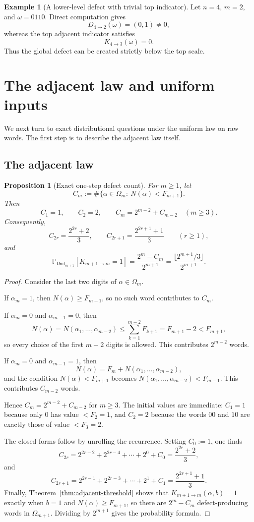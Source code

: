 \documentclass[11pt,reqno]{amsart}
\numberwithin{equation}{section}
\theoremstyle{plain}
\newtheorem{proposition}[theorem]{Proposition}
\theoremstyle{definition}
\newtheorem{example}[theorem]{Example}
\theoremstyle{remark}
\newcommand{\PP}{\mathbb{P}}
\newcommand{\Unif}{\mathsf{Unif}}
\begin{document}
\begin{example}[A lower-level defect with trivial top indicator]
\label{ex:defect-without-top-indicator}
Let $n=4$, $m=2$, and $\omega=0110$.  Direct computation gives
\[
D_{4\to 2}(\omega)=(0,1)\ne 0,
\]
whereas the top adjacent indicator satisfies
\[
K_{4\to 3}(\omega)=0.
\]
Thus the global defect can be created strictly below the top scale.
\end{example}

\section{The adjacent law and uniform inputs}
\label{sec:uniform}

We next turn to exact distributional questions under the uniform law on raw
words.  The first step is to describe the adjacent law itself.

\subsection{The adjacent law}

\begin{proposition}[Exact one-step defect count]
\label{thm:explicit-count}
For $m\ge 1$, let
\[
C_m:=\#\{\alpha\in\Omega_m:\ N(\alpha)<F_{m+1}\}.
\]
Then
\[
C_1=1,
\qquad
C_2=2,
\qquad
C_m=2^{m-2}+C_{m-2}\quad (m\ge 3).
\]
Consequently,
\[
C_{2r}=\frac{2^{2r}+2}{3},
\qquad
C_{2r+1}=\frac{2^{2r+1}+1}{3}
\qquad (r\ge 1),
\]
and
\[
\PP_{\Unif_{m+1}}[K_{m+1\to m}=1]
=
\frac{2^m-C_m}{2^{m+1}}
=
\frac{\lfloor 2^{m+1}/3\rfloor}{2^{m+1}}.
\]
\end{proposition}

\begin{proof}
Consider the last two digits of $\alpha\in\Omega_m$.

If $\alpha_m=1$, then $N(\alpha)\ge F_{m+1}$, so no such word contributes to
$C_m$.

If $\alpha_m=0$ and $\alpha_{m-1}=0$, then
\[
N(\alpha)=N(\alpha_1,\dots,\alpha_{m-2})
\le
\sum_{k=1}^{m-2}F_{k+1}
=
F_{m+1}-2
<
F_{m+1},
\]
so every choice of the first $m-2$ digits is allowed.  This contributes
$2^{m-2}$ words.

If $\alpha_m=0$ and $\alpha_{m-1}=1$, then
\[
N(\alpha)=F_m+N(\alpha_1,\dots,\alpha_{m-2}),
\]
and the condition $N(\alpha)<F_{m+1}$ becomes
$N(\alpha_1,\dots,\alpha_{m-2})<F_{m-1}$.  This contributes $C_{m-2}$ words.

Hence $C_m=2^{m-2}+C_{m-2}$ for $m\ge 3$.  The initial values are immediate:
$C_1=1$ because only $0$ has value $<F_2=1$, and $C_2=2$ because the words
$00$ and $10$ are exactly those of value $<F_3=2$.

The closed forms follow by unrolling the recurrence.  Setting $C_0:=1$, one
finds
\[
C_{2r}=2^{2r-2}+2^{2r-4}+\cdots+2^0+C_0=\frac{2^{2r}+2}{3},
\]
and
\[
C_{2r+1}=2^{2r-1}+2^{2r-3}+\cdots+2^1+C_1=\frac{2^{2r+1}+1}{3}.
\]
Finally, Theorem~\ref{thm:adjacent-threshold} shows that
$K_{m+1\to m}(\alpha,b)=1$ exactly when $b=1$ and $N(\alpha)\ge F_{m+1}$, so
there are $2^m-C_m$ defect-producing words in $\Omega_{m+1}$.  Dividing by
$2^{m+1}$ gives the probability formula.
\end{proof}
\end{document}

